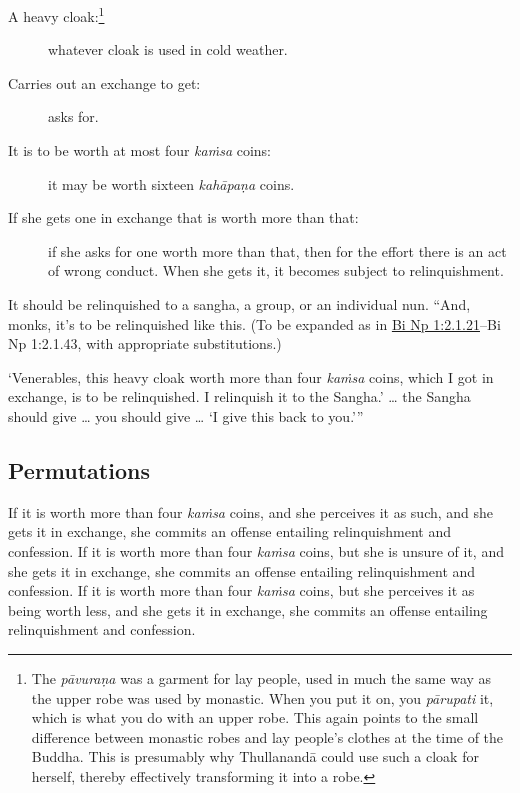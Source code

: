 \documentclass[12pt,openany]{book}%
\begin{document}
\begin{description}%
\item[A heavy cloak:\footnote{The \textit{\textsanskrit{pāvuraṇa}} was a garment for lay people, used in much the same way as the upper robe was used by monastic. When you put it on, you \textit{\textsanskrit{pārupati}} it, which is what you do with an upper robe. This again points to the small difference between monastic robes and lay people’s clothes at the time of the Buddha. This is presumably why \textsanskrit{Thullanandā} could use such a cloak for herself, thereby effectively transforming it into a robe. } ] whatever cloak is used in cold weather. %
\item[Carries out an exchange to get: ] asks for. %
\item[It is to be worth at most four \textit{\textsanskrit{kaṁsa}} coins: ] it may be worth sixteen \textit{\textsanskrit{kahāpaṇa}} coins. %
\item[If she gets one in exchange that is worth more than that: ] if she asks for one worth more than that, then for the effort there is an act of wrong conduct. When she gets it, it becomes subject to relinquishment. %
\end{description}

It should be relinquished to a sangha, a group, or an individual nun. “And, monks, it’s to be relinquished like this.  (To be expanded as in \href{https://suttacentral.net/pli-tv-bi-vb-np1/en/brahmali\#2.1.21}{Bi Np 1:2.1.21}–Bi Np 1:2.1.43, with appropriate substitutions.) 

‘Venerables, this heavy cloak worth more than four \textit{\textsanskrit{kaṁsa}} coins, which I got in exchange, is to be relinquished. I relinquish it to the Sangha.’ … the Sangha should give … you should give … ‘I give this back to you.’” 

\subsection*{Permutations }

If it is worth more than four \textit{\textsanskrit{kaṁsa}} coins, and she perceives it as such, and she gets it in exchange, she commits an offense entailing relinquishment and confession. If it is worth more than four \textit{\textsanskrit{kaṁsa}} coins, but she is unsure of it, and she gets it in exchange, she commits an offense entailing relinquishment and confession. If it is worth more than four \textit{\textsanskrit{kaṁsa}} coins, but she perceives it as being worth less, and she gets it in exchange, she commits an offense entailing relinquishment and confession. 
\end{document}
